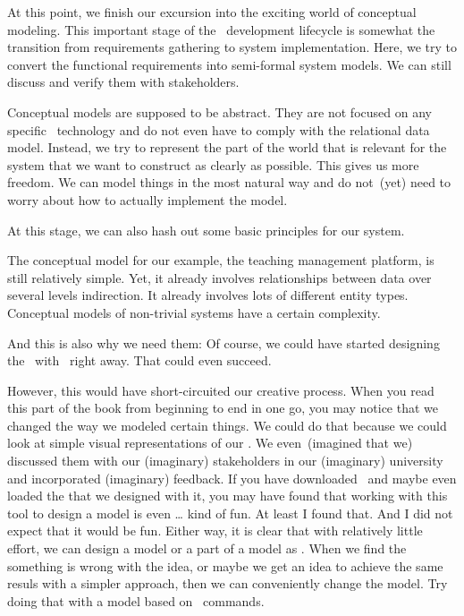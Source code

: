 %
%
At this point, we finish our excursion into the exciting world of conceptual modeling.
This important stage of the \db\ development lifecycle is somewhat the transition from requirements gathering to system implementation.
Here, we try to convert the functional requirements into semi-formal system models.
We can still discuss and verify them with stakeholders.

Conceptual models are supposed to be abstract.
They are not focused on any specific \db\ technology and do not even have to comply with the relational data model.
Instead, we try to represent the part of the world that is relevant for the system that we want to construct as clearly as possible.
This gives us more freedom.
We can model things in the most natural way and do not~(yet) need to worry about how to actually implement the model.

At this stage, we can also hash out some basic principles for our system.

The conceptual model for our example, the teaching management platform, is still relatively simple.
Yet, it already involves relationships between data over several levels indirection.
It already involves lots of different entity types.
Conceptual models of non-trivial systems have a certain complexity.

And this is also why we need them:
Of course, we could have started designing the \db\ with \sql\ right away.
That could even succeed.

However, this would have short-circuited our creative process.
When you read this part of the book from beginning to end in one go, you may notice that we changed the way we modeled certain things.
We could do that because we could look at simple visual representations of our \db.
We even~(imagined that we) discussed them with our (imaginary) stakeholders in our (imaginary) university and incorporated (imaginary) feedback.
If you have downloaded \yEd\ and maybe even loaded the  that we designed with it, you may have found that working with this tool to design a model is even {\dots} kind of fun.
At least I found that.
And I did not expect that it would be fun.
Either way, it is clear that with relatively little effort, we can design a model or a part of a model as .
When we find the something is wrong with the idea, or maybe we get an idea to achieve the same resuls with a simpler approach, then we can conveniently change the model.
Try doing that with a model based on \sql\ commands.%
%
\endhsection%
%
